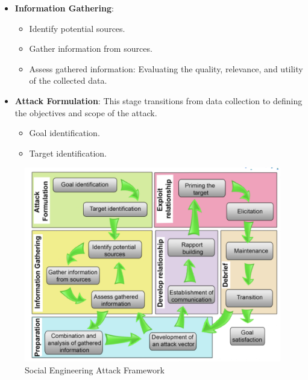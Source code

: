 \begin{multicols}{2}
    \begin{itemize}
        \item \textbf{Information Gathering}:
        \begin{itemize}
            \item Identify potential sources.
            \item Gather information from sources.
            \item Assess gathered information: Evaluating the quality, relevance, and utility of the collected data.
        \end{itemize}
        \item \textbf{Attack Formulation}: This stage transitions from data collection to defining the objectives and scope of the attack.
        \begin{itemize}
            \item Goal identification.
            \item Target identification.
        \end{itemize}
        
    \end{itemize}

    \columnbreak

    \begin{figure}[H]
        \centering
        \includegraphics[width=\linewidth]{Images/Sociology/SEframework.png}
        \caption{Social Engineering Attack Framework}
        \label{fig:SEframework}
    \end{figure}
    
\end{multicols}


